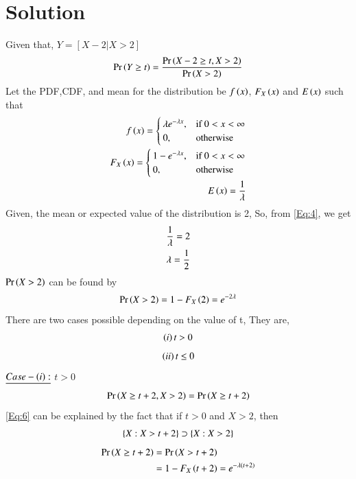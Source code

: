 \documentclass[journal,12pt,twocolumn]{IEEEtran}
\begin{document}
\section{Solution}
Given that, $Y=[X-2|X>2]$
\begin{align}
\Pr\left(Y \geq t\right) = \frac{\Pr\left(X-2 \geq t, X>2\right)}{\Pr\left(X>2\right)} \label{Eq:1}
\end{align}
Let the PDF,CDF, and mean for the distribution be $f\left(x\right)$, $F_X\left(x\right)$ and $E\left(x\right)$ such that
\begin{align}
f\left(x\right) = \begin{cases} \label{Eq:2}
			\lambda e^{-\lambda x}, & \text{if $0 < x< \infty $}\\
            0, & \text{otherwise}
		 \end{cases} \\
F_X\left(x\right) = \begin{cases} \label{Eq:3}
			1 - e^{-\lambda x}, & \text{if $0 < x< \infty $}\\
            0, & \text{otherwise}
		 \end{cases} \\
E\left(x\right) = \frac{1}{\lambda} \label{Eq:4}
\end{align}
Given, the mean or expected value of the distribution is 2, So, from \eqref{Eq:4}, we get
\begin{align}
\frac{1}{\lambda} = 2 \notag \\
\lambda = \frac{1}{2} \label{Eq:5}
\end{align}
$\Pr\left(X > 2\right)$ can be found by
\begin{align}
\Pr\left(X >2\right) = 1- F_X\left(2\right) = e^{-2\lambda} \label{Eq:7} 
\end{align}
There are two cases possible depending on the value of t, They are,
\begin{align}
\left(i\right) t>0 \notag
\end{align}
\begin{align}
\left(ii\right) t\leq 0 \notag
\end{align}
$\underline{Case-\left(i\right):}$ $t>0$
\begin{align}
\Pr\left(X \geq t+2,X>2\right) = \Pr\left(X \geq t+2\right) \label{Eq:6}
\end{align}
\eqref{Eq:6} can be explained by the fact that if $t>0$ and $X>2$, then \begin{align}
\{X:X>t+2\} \supset \{X:X>2\} \notag
\end{align}
\begin{align}
\Pr\left(X \geq t+2\right) & = \Pr\left(X > t+2\right) \notag \\  &= 1- F_X\left(t+2\right) = e^{-\lambda \left(t+2\right)}\label{Eq:8}
\end{align}
\end{document}
